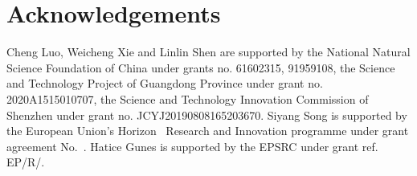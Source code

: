 \documentclass{article}
\begin{document}
\begin{table}[h!]
    \centering
    \small
    \caption{AUC results achieved for 8 AUs on DISFA dataset.}
    \label{ex:tab_AUC}
\end{table}

\section*{Acknowledgements}
Cheng Luo, Weicheng Xie and Linlin Shen are supported by the National Natural Science Foundation of China under grants no. 61602315, 91959108, the Science and Technology Project of Guangdong Province under grant no. 2020A1515010707, the Science and Technology Innovation Commission of Shenzhen under grant no. JCYJ20190808165203670. Siyang Song is supported by the European Union's Horizon~ Research and Innovation programme under grant agreement No.~. Hatice Gunes is supported by the EPSRC under grant ref. EP/R/. 





\begin{acronym}
\end{acronym}





\end{document}
